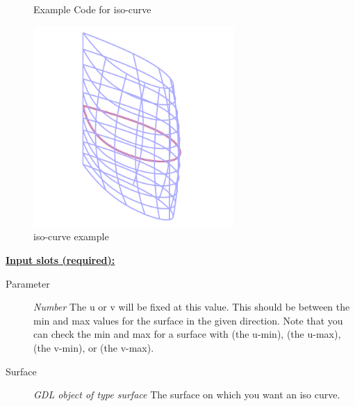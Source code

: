 \documentclass [11pt]{book}
\begin{document}
\begin{itemize}
\begin{figure}
\begin{lrbox}{\boxedverb}
\begin{minipage}{\linewidth}
{\begin{verbatim}
                  
 
\end{verbatim}}
\end{minipage}
\end{lrbox}
\fbox{\usebox{\boxedverb}}

\caption{Example Code for iso-curve}

\label{fig:example-code-iso-curve}

\end{figure}

\begin{figure}
\begin{center}
\includegraphics[width=3in,height=3in]{../images/example-iso-curve.pdf}
\end{center}

\caption{iso-curve example}

\label{fig:iso-curve}

\end{figure}





\textbf{
\underline{Input slots (required):}}

\begin{description}

\item [Parameter]
\emph{Number} The u or v will be fixed at this value.
This should be between the min and max values for the surface in the given direction. Note that
you can check the min and max for a surface with (the u-min), (the u-max), (the v-min), or (the v-max).


\item [Surface]
\emph{GDL object of type surface} The surface on which you want an iso curve.



\end{description}
\end{itemize}
\end{document}
